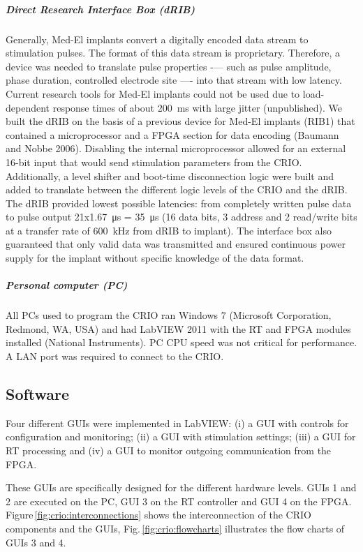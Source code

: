 \subparagraph{Direct Research Interface Box (dRIB)}
Generally, Med-El implants convert a digitally encoded data stream to stimulation pulses. The format of this data stream is proprietary. Therefore, a device was needed to translate pulse properties -— such as pulse amplitude, phase duration, controlled electrode site —- into that stream with low latency. Current research tools for Med-El implants could not be used due to load-dependent response times of about \SI{200}{\milli\second} with large jitter (unpublished).
We built the dRIB on the basis of a previous device for Med-El implants (RIB1) that contained a microprocessor and a FPGA section for data encoding (Baumann and Nobbe 2006). Disabling the internal microprocessor allowed for an external 16-bit input that would send stimulation parameters from the CRIO. Additionally, a level shifter and boot-time disconnection logic were built and added to translate between the different logic levels of the CRIO and the dRIB. The dRIB provided lowest possible latencies: from completely written pulse data to pulse output 21x\SI{1.67}{\micro\second} = \SI{35}{\micro\second} (16 data bits, 3 address and 2 read/write bits at a transfer rate of \SI{600}{\kilo\hertz} from dRIB to implant). The interface box also guaranteed that only valid data was transmitted and ensured continuous power supply for the implant without specific knowledge of the data format.

\subparagraph{Personal computer (PC)}
All PCs used to program the CRIO ran Windows 7 (Microsoft Corporation, Redmond, WA, USA) and had LabVIEW 2011 with the RT and FPGA modules installed (National Instruments). PC CPU speed was not critical for performance. A LAN port was required to connect to the CRIO.

\subsection{Software}
Four different GUIs were implemented in LabVIEW: (i) a GUI with controls for configuration and monitoring; (ii) a GUI with stimulation settings; (iii) a GUI for RT processing and (iv) a GUI to monitor outgoing communication from the FPGA.

	These GUIs are specifically designed for the different hardware levels. GUIs 1 and 2 are executed on the PC, GUI 3 on the RT controller and GUI 4 on the FPGA. Figure\,\ref{fig:crio:interconnections} shows the interconnection of the CRIO components and the GUIs, Fig.\,\ref{fig:crio:flowcharts} illustrates the flow charts of GUIs 3 and 4.
	
